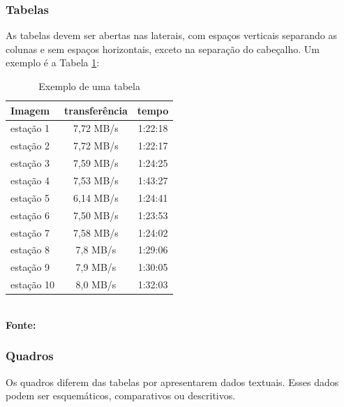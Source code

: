    \newpage

 \subsubsection{\esp Tabelas}

As tabelas devem ser abertas nas laterais, com espaços verticais separando
as colunas e sem espaços horizontais, exceto na
separação do cabeçalho. Um exemplo é a Tabela \ref{tab:tabela1}: 

\begin{table}[htb]
	\centering
	\caption{Exemplo de uma tabela}
	\vspace{-0.3cm} %
	\label{tab:tabela1}
	\begin{tabular}{l|c|c}
  \hline
    \textbf{Imagem}	& \textbf{transferência} & \textbf{tempo} \\
    \hline
     estação 1	& 7,72 MB/s &  1:22:18 \\
     estação 2	& 7,72 MB/s &  1:22:17 \\
     estação 3	& 7,59 MB/s & 1:24:25 \\
     estação 4  & 7,53 MB/s & 1:43:27 \\
     estação 5	& 6,14 MB/s  &  1:24:41 \\
     estação 6  &  7,50 MB/s & 1:23:53 \\
     estação 7  & 7,58 MB/s  &  1:24:02 \\
     estação 8  & 7,8 MB/s  &  1:29:06 \\
     estação 9  & 7,9 MB/s  &  1:30:05 \\
     estação 10 & 8,0 MB/s  &  1:32:03 \\
     \hline
 \end{tabular}
 	\vspace{.1cm}  %
	\small
	{\footnotesize\\ \textbf{Fonte: }}
\end{table}

\subsubsection{\esp Quadros}

Os quadros diferem das tabelas por apresentarem dados textuais.
Esses dados podem ser esquemáticos, comparativos ou descritivos.
  	
